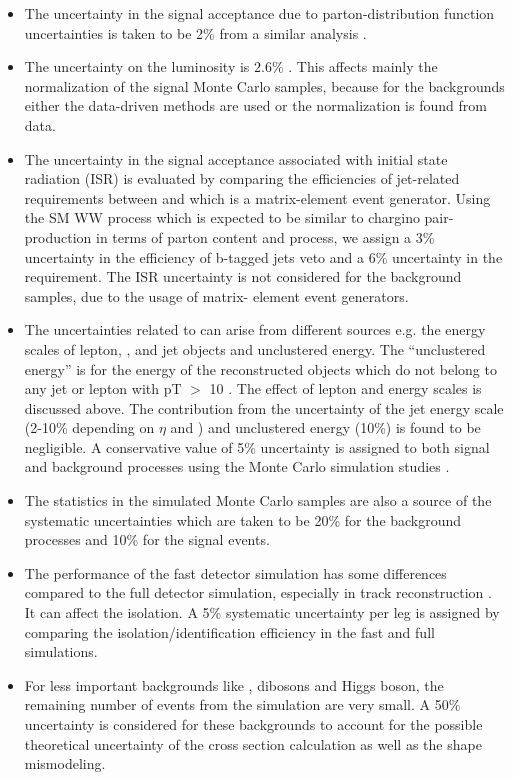 \begin{itemize}
\item The uncertainty in the signal acceptance due to parton-distribution function uncertainties 
  is taken to be 2\% from a similar analysis \cite{Khachatryan:2014qwa}.

\item The uncertainty on the luminosity  is $2.6\%$ \cite{CMS-PAS-LUM-13-001}.  This affects mainly the
  normalization of the signal Monte Carlo samples, because for the backgrounds  either  the data-driven methods are used or 
the normalization is found from data.

\item The uncertainty in the signal acceptance associated with initial state radiation (ISR)
is evaluated by comparing the efficiencies of jet-related requirements between \PYTHIA
 and \MADGRAPH which is a matrix-element event generator. Using the SM WW process which
 is expected to be similar to chargino pair-production in terms of parton content and process, we assign a 3\% uncertainty in 
the efficiency of  b-tagged jets veto and a 6\% uncertainty in the \deltaphi requirement. The ISR
 uncertainty is not considered for the background samples, due to the usage of matrix-
 element event generators.

\item The uncertainties related to \MPT can arise from different sources e.g.  the energy scales of lepton, \Tau, and jet
objects and unclustered energy.  The ``unclustered energy'' is for the energy of the reconstructed objects which
 do not belong to any jet or lepton with pT $>$ 10 \GeV. The effect of lepton and \Tau
 energy scales is discussed above. The contribution from the uncertainty of the jet energy scale (2-10\% depending on $\eta$  and \PT) and
 unclustered energy (10\%) is found to be negligible. A conservative value of 5\% uncertainty
 is assigned to both signal and background processes using the Monte
 Carlo simulation studies \cite{Khachatryan:2015kxa, Khachatryan:2014qwa}.

\item The statistics in the simulated Monte Carlo samples are also a
 source of the systematic uncertainties which are taken to be 20\% for the background processes and 10\% for the signal events.

\item The performance of the fast detector simulation has some differences compared to the full detector simulation, especially in
 track reconstruction \cite{Khachatryan:2015kxa}. It can affect the \Tau isolation. A 5\% systematic uncertainty per
 \Tau leg is assigned by comparing the \Tau isolation/identification efficiency in the fast
 and full simulations. 


\item For less important backgrounds like \ttbar,  dibosons and Higgs boson, the remaining number of
events from the simulation are very small. A 50\% uncertainty is considered for these backgrounds to account for the possible theoretical uncertainty of the
cross section calculation as well as the shape mismodeling.
\end{itemize}


